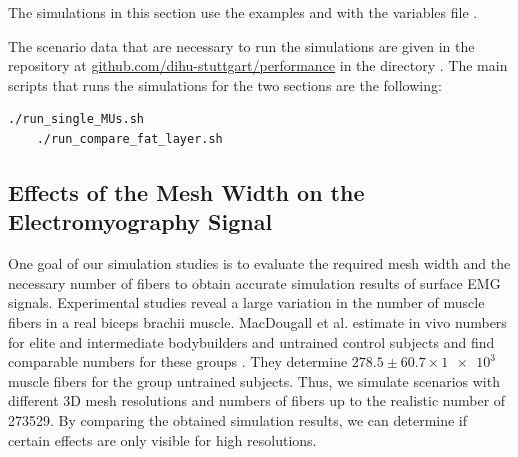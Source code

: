 \begin{reproduce}
  The simulations in this section use the examples  and  with the variables file .

  The scenario data that are necessary to run the simulations are given in the repository at \href{https://github.com/dihu-stuttgart/performance}{github.com/dihu-stuttgart/performance}
  in the directory . The main scripts that runs the simulations for the two sections are the following:
  \begin{lstlisting}[columns=fullflexible,breaklines=true,postbreak=\mbox{\textcolor{gray}{$\hookrightarrow$}\space}]
    ./run_single_MUs.sh
    ./run_compare_fat_layer.sh
  \end{lstlisting}
\end{reproduce}


\subsection{Effects of the Mesh Width on the Electromyography Signal}\label{sec:effects_of_the_mesh_width_emg}


One goal of our simulation studies is to evaluate the required mesh width and the necessary number of fibers to obtain accurate simulation results of surface EMG signals.
Experimental studies reveal a large variation in the number of muscle fibers in a real biceps brachii muscle. MacDougall et al. estimate in vivo numbers for elite and intermediate bodybuilders and untrained control subjects and find comparable numbers for these groups \cite{MacDougall1984}. They determine $278.5 \pm 60.7 \times \num{1e3}$ muscle fibers for the group untrained subjects.
Thus, we simulate scenarios with different 3D mesh resolutions and numbers of fibers up to the realistic number of \num{273529}. By comparing the obtained simulation results, we can determine if certain effects are only visible for high resolutions.

